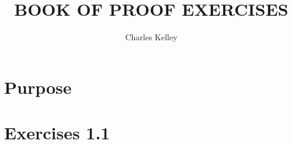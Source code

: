 \documentclass{article}
\title{BOOK OF PROOF EXERCISES}
\author{Charles Kelley}
\date{ }
\begin{document}
\maketitle

\section{Purpose}


\section{Exercises 1.1}

\end{document}
